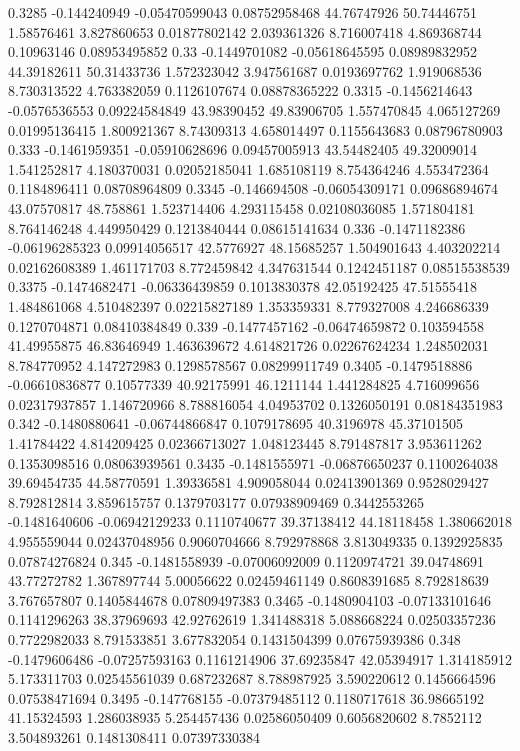 {0.3285 -0.144240949 -0.05470599043 0.08752958468 44.76747926 50.74446751 1.58576461 3.827860653 0.01877802142 2.039361326 8.716007418 4.869368744 0.10963146 0.08953495852
0.33 -0.1449701082 -0.05618645595 0.08989832952 44.39182611 50.31433736 1.572323042 3.947561687 0.0193697762 1.919068536 8.730313522 4.763382059 0.1126107674 0.08878365222
0.3315 -0.1456214643 -0.0576536553 0.09224584849 43.98390452 49.83906705 1.557470845 4.065127269 0.01995136415 1.800921367 8.74309313 4.658014497 0.1155643683 0.08796780903
0.333 -0.1461959351 -0.05910628696 0.09457005913 43.54482405 49.32009014 1.541252817 4.180370031 0.02052185041 1.685108119 8.754364246 4.553472364 0.1184896411 0.08708964809
0.3345 -0.146694508 -0.06054309171 0.09686894674 43.07570817 48.758861 1.523714406 4.293115458 0.02108036085 1.571804181 8.764146248 4.449950429 0.1213840444 0.08615141634
0.336 -0.1471182386 -0.06196285323 0.09914056517 42.5776927 48.15685257 1.504901643 4.403202214 0.02162608389 1.461171703 8.772459842 4.347631544 0.1242451187 0.08515538539
0.3375 -0.1474682471 -0.06336439859 0.1013830378 42.05192425 47.51555418 1.484861068 4.510482397 0.02215827189 1.353359331 8.779327008 4.246686339 0.1270704871 0.08410384849
0.339 -0.1477457162 -0.06474659872 0.103594558 41.49955875 46.83646949 1.463639672 4.614821726 0.02267624234 1.248502031 8.784770952 4.147272983 0.1298578567 0.08299911749
0.3405 -0.1479518886 -0.06610836877 0.10577339 40.92175991 46.1211144 1.441284825 4.716099656 0.02317937857 1.146720966 8.788816054 4.04953702 0.1326050191 0.08184351983
0.342 -0.1480880641 -0.06744866847 0.1079178695 40.3196978 45.37101505 1.41784422 4.814209425 0.02366713027 1.048123445 8.791487817 3.953611262 0.1353098516 0.08063939561
0.3435 -0.1481555971 -0.06876650237 0.1100264038 39.69454735 44.58770591 1.39336581 4.909058044 0.02413901369 0.9528029427 8.792812814 3.859615757 0.1379703177 0.07938909469
0.3442553265 -0.1481640606 -0.06942129233 0.1110740677 39.37138412 44.18118458 1.380662018 4.955559044 0.02437048956 0.9060704666 8.792978868 3.813049335 0.1392925835 0.07874276824
0.345 -0.1481558939 -0.07006092009 0.1120974721 39.04748691 43.77272782 1.367897744 5.00056622 0.02459461149 0.8608391685 8.792818639 3.767657807 0.1405844678 0.07809497383
0.3465 -0.1480904103 -0.07133101646 0.1141296263 38.37969693 42.92762619 1.341488318 5.088668224 0.02503357236 0.7722982033 8.791533851 3.677832054 0.1431504399 0.07675939386
0.348 -0.1479606486 -0.07257593163 0.1161214906 37.69235847 42.05394917 1.314185912 5.173311703 0.02545561039 0.687232687 8.788987925 3.590220612 0.1456664596 0.07538471694
0.3495 -0.147768155 -0.07379485112 0.1180717618 36.98665192 41.15324593 1.286038935 5.254457436 0.02586050409 0.6056820602 8.7852112 3.504893261 0.1481308411 0.07397330384
}
